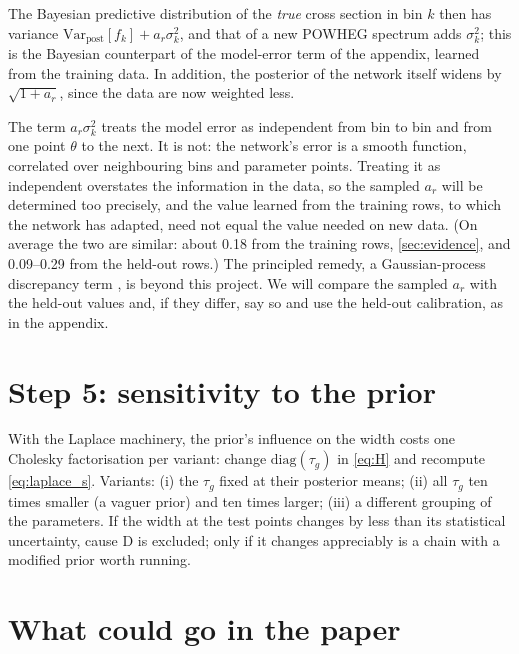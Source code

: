 The Bayesian predictive distribution of the \emph{true} cross section in bin $k$ then has
variance $\mathrm{Var}_\text{post}[f_k] + a_r\sigma_k^2$, and that of a new POWHEG spectrum
adds $\sigma_k^2$; this is the Bayesian counterpart of the model-error term of the
appendix, learned from the training data. In addition, the posterior of the network itself
widens by $\sqrt{1 + a_r}$, since the data are now weighted less.

\begin{watch}
The term $a_r\sigma_k^2$ treats the model error as independent from bin to bin and from one
point $\theta$ to the next. It is not: the network's error is a smooth function, correlated
over neighbouring bins and parameter points. Treating it as independent overstates the
information in the data, so the sampled $a_r$ will be determined too precisely, and the
value learned from the training rows, to which the network has adapted, need not equal the
value needed on new data. (On average the two are similar: about 0.18 from the training
rows, \cref{sec:evidence}, and 0.09--0.29 from the held-out rows.) The principled remedy, a Gaussian-process
discrepancy term \cite{Kennedy:2001}, is beyond this project. We will compare the sampled
$a_r$ with the held-out values and, if they differ, say so and use the held-out
calibration, as in the appendix.
\end{watch}

\section{Step 5: sensitivity to the prior}
\label{sec:prior}

With the Laplace machinery, the prior's influence on the width costs one Cholesky
factorisation per variant: change $\mathrm{diag}(\tau_g)$ in \cref{eq:H} and recompute
\cref{eq:laplace_s}. Variants: (i) the $\tau_g$ fixed at their posterior means; (ii) all
$\tau_g$ ten times smaller (a vaguer prior) and ten times larger; (iii) a different
grouping of the parameters. If the width at the test points changes by less than its
statistical uncertainty, cause D is excluded; only if it changes appreciably is a chain with
a modified prior worth running.

\section{What could go in the paper}
\label{sec:paper}

